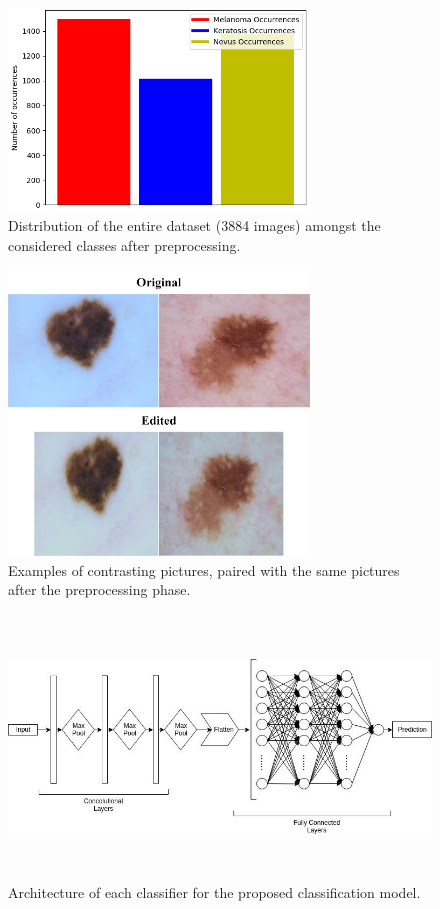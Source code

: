 \documentclass[10pt]{IEEEtran}
\begin{document}
\begin{figure}[H]
\centering
\includegraphics[width=8cm]{ISIC_DataClassificationDistribution_Rotations.jpg}
\caption{Distribution of the entire dataset (3884 images) amongst the considered classes after preprocessing.}
\label{fig:datadistribution2}
\end{figure}

\begin{figure}[H]
\centering
\includegraphics[width=8cm]{SkinLesions.jpg}
\caption{Examples of contrasting pictures, paired with the same pictures after the preprocessing phase.}
\label{fig:skinlesions}
\end{figure}

\begin{figure}[h]
\centering
\includegraphics[width=\textwidth, height=7cm]{ModelArchitecture_1Classifier.jpg}
\caption{Architecture of each classifier for the proposed classification model.}
\label{fig:modelarchitecture}
\end{figure}
\end{document}
